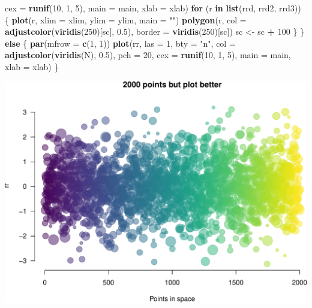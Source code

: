 \documentclass[article]{article}
\newenvironment{Shaded}{\begin{snugshade}}{\end{snugshade}}
\newcommand{\KeywordTok}[1]{\textcolor[rgb]{0.13,0.29,0.53}{\textbf{#1}}}
\newcommand{\DataTypeTok}[1]{\textcolor[rgb]{0.13,0.29,0.53}{#1}}
\newcommand{\DecValTok}[1]{\textcolor[rgb]{0.00,0.00,0.81}{#1}}
\newcommand{\FloatTok}[1]{\textcolor[rgb]{0.00,0.00,0.81}{#1}}
\newcommand{\StringTok}[1]{\textcolor[rgb]{0.31,0.60,0.02}{#1}}
\newcommand{\ControlFlowTok}[1]{\textcolor[rgb]{0.13,0.29,0.53}{\textbf{#1}}}
\newcommand{\OperatorTok}[1]{\textcolor[rgb]{0.81,0.36,0.00}{\textbf{#1}}}
\newcommand{\NormalTok}[1]{#1}
\begin{document}
\begin{Shaded}
\begin{Highlighting}[]
        \DataTypeTok{cex =} \KeywordTok{runif}\NormalTok{(}\DecValTok{10}\NormalTok{, }\DecValTok{1}\NormalTok{, }
            \DecValTok{5}\NormalTok{), }\DataTypeTok{main =}\NormalTok{ main, }
        \DataTypeTok{xlab =}\NormalTok{ xlab)}
    \ControlFlowTok{for}\NormalTok{ (r }\ControlFlowTok{in} \KeywordTok{list}\NormalTok{(rrd, rrd2, }
\NormalTok{        rrd3)) \{}
        \KeywordTok{plot}\NormalTok{(r, }\DataTypeTok{xlim =}\NormalTok{ xlim, }
            \DataTypeTok{ylim =}\NormalTok{ ylim, }\DataTypeTok{main =} \StringTok{""}\NormalTok{)}
        \KeywordTok{polygon}\NormalTok{(r, }\DataTypeTok{col =} \KeywordTok{adjustcolor}\NormalTok{(}\KeywordTok{viridis}\NormalTok{(}\DecValTok{250}\NormalTok{)[sc], }
            \FloatTok{0.5}\NormalTok{), }\DataTypeTok{border =} \KeywordTok{viridis}\NormalTok{(}\DecValTok{250}\NormalTok{)[sc])}
\NormalTok{        sc <-}\StringTok{ }\NormalTok{sc }\OperatorTok{+}\StringTok{ }\DecValTok{100}
\NormalTok{    \}}
\NormalTok{\} }\ControlFlowTok{else}\NormalTok{ \{}
    \KeywordTok{par}\NormalTok{(}\DataTypeTok{mfrow =} \KeywordTok{c}\NormalTok{(}\DecValTok{1}\NormalTok{, }\DecValTok{1}\NormalTok{))}
    \KeywordTok{plot}\NormalTok{(rr, }\DataTypeTok{las =} \DecValTok{1}\NormalTok{, }\DataTypeTok{bty =} \StringTok{"n"}\NormalTok{, }
        \DataTypeTok{col =} \KeywordTok{adjustcolor}\NormalTok{(}\KeywordTok{viridis}\NormalTok{(N), }
            \FloatTok{0.5}\NormalTok{), }\DataTypeTok{pch =} \DecValTok{20}\NormalTok{, }
        \DataTypeTok{cex =} \KeywordTok{runif}\NormalTok{(}\DecValTok{10}\NormalTok{, }\DecValTok{1}\NormalTok{, }
            \DecValTok{5}\NormalTok{), }\DataTypeTok{main =}\NormalTok{ main, }
        \DataTypeTok{xlab =}\NormalTok{ xlab)}
\NormalTok{\}}
\end{Highlighting}
\end{Shaded}

\includegraphics{Lesson5_rmd_files/figure-latex/unnamed-chunk-2-1.pdf}
\end{document}
